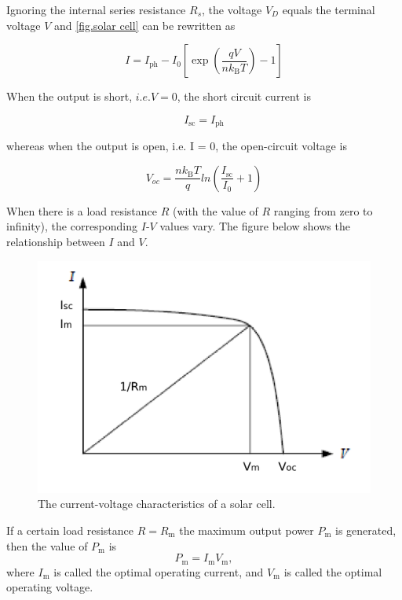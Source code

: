 \documentclass{article}
\begin{document}
Ignoring the internal series resistance $R_s$, the voltage $V_D$ equals the terminal voltage $V$ and \eqref{fig.solar cell} can be rewritten as

\begin{equation}
I=I_{\mathrm{ph}}-I_{0}\left[\exp \left(\frac{q V}{n k_{\mathrm{B}} T}\right)-1\right]
\end{equation}

When the output is short, $i.e. V = 0$, the short circuit current is 

\begin{equation}
I_{\mathrm{sc}} = I_{\mathrm{ph}}
\end{equation} 

whereas when the output is open, i.e. I = 0, the open-circuit voltage is

\begin{equation}
V_{oc} = \frac{nk_{\mathrm{B}}T}{q}ln(\frac{I_{\mathrm{sc}}}{I_{\mathrm{0}}}+1)
\end{equation}

When there is a load resistance $R$ (with the value of $R$ ranging from zero to infinity), the corresponding $I$-$V$ values vary. The figure below shows the relationship between $I$ and $V$.

\begin{figure}[H]
\centering
\includegraphics[scale=0.5]{I-V}
\caption{The current-voltage characteristics of a solar cell.}
\end{figure}

If a certain load resistance $R = R_\text{m}$ the maximum output power $P_\text{m}$ is generated, then the value of $P_\text{m}$ is
$$P_\text{m} = I_\text{m}V_\text{m},$$
where $I_\text{m}$ is called the optimal operating current, and $V_\text{m}$ is called the optimal operating voltage.
\end{document}
